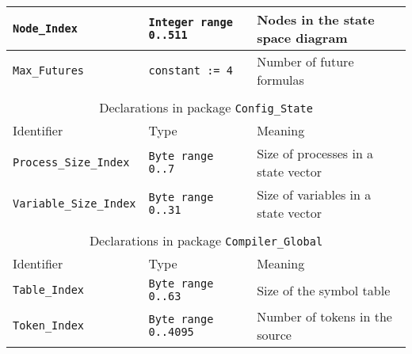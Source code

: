 \documentclass[11pt]{article}
\newcommand*{\p}[1]{\texttt{#1}}
\begin{document}
\begin{center}
\begin{tabular}{|l|l|l|}
\p{Node\_Index} & \p{Integer range 0..511} & Nodes in the state space diagram\\\hline
\p{Max\_Futures} & \p{constant := 4} & Number of future formulas\\\hline
\multicolumn{3}{c}{}\\\hline
\multicolumn{3}{|c|}{Declarations in package \p{Config\_State}}\\\hline
Identifier & Type & Meaning\\\hline\hline
\p{Process\_Size\_Index} & \p{Byte range 0..7} & Size of processes in a state vector\\\hline
\p{Variable\_Size\_Index} & \p{Byte range 0..31} & Size of variables in a state vector\\\hline
\multicolumn{3}{c}{}\\\hline
\multicolumn{3}{|c|}{Declarations in package \p{Compiler\_Global}}\\\hline
Identifier & Type & Meaning\\\hline\hline
\p{Table\_Index} & \p{Byte range 0..63} & Size of the symbol table\\\hline
\p{Token\_Index} & \p{Byte range 0..4095} & Number of tokens in the source\\\hline
\end{tabular}
\end{center}
\end{document}
